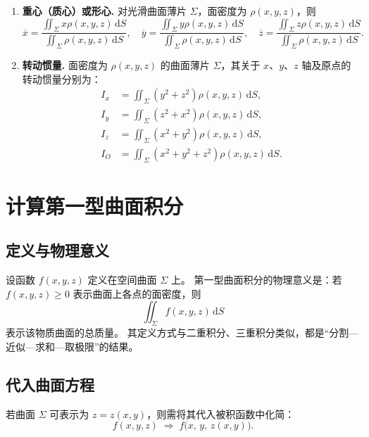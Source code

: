 \begin{enumerate}
      \item \textbf{重心（质心）或形心.}
            对光滑曲面薄片 $\Sigma$，面密度为 $\rho(x,y,z)$，则
            \[
                  \overline{x} = \frac{\iint_{\Sigma} x\rho(x,y,z)\, \mathrm{d}S}{\iint_{\Sigma} \rho(x,y,z)\, \mathrm{d}S}, \quad
                  \overline{y} = \frac{\iint_{\Sigma} y\rho(x,y,z)\, \mathrm{d}S}{\iint_{\Sigma} \rho(x,y,z)\, \mathrm{d}S}, \quad
                  \overline{z} = \frac{\iint_{\Sigma} z\rho(x,y,z)\, \mathrm{d}S}{\iint_{\Sigma} \rho(x,y,z)\, \mathrm{d}S}.
            \]

      \item \textbf{转动惯量.}
            面密度为 $\rho(x,y,z)$ 的曲面薄片 $\Sigma$，其关于 $x$、$y$、$z$ 轴及原点的转动惯量分别为：
            \[
                  \begin{aligned}
                        I_x & = \iint_{\Sigma} (y^2 + z^2)\rho(x,y,z)\, \mathrm{d}S,       \\
                        I_y & = \iint_{\Sigma} (z^2 + x^2)\rho(x,y,z)\, \mathrm{d}S,       \\
                        I_z & = \iint_{\Sigma} (x^2 + y^2)\rho(x,y,z)\, \mathrm{d}S,       \\
                        I_O & = \iint_{\Sigma} (x^2 + y^2 + z^2)\rho(x,y,z)\, \mathrm{d}S.
                  \end{aligned}
            \]
\end{enumerate}

\section{计算第一型曲面积分}

\subsection{定义与物理意义}

设函数 $f(x,y,z)$ 定义在空间曲面 $\Sigma$ 上。
第一型曲面积分的物理意义是：若 $f(x,y,z) \ge 0$ 表示曲面上各点的面密度，则
\[
      \iint_{\Sigma} f(x,y,z)\,\mathrm{d}S
\]
表示该物质曲面的总质量。
其定义方式与二重积分、三重积分类似，都是“分割—近似—求和—取极限”的结果。


\subsection{代入曲面方程}

若曲面 $\Sigma$ 可表示为 $z = z(x,y)$，则需将其代入被积函数中化简：
\[
      f(x,y,z) \;\Rightarrow\; f\big(x,\,y,\,z(x,y)\big).
\]


